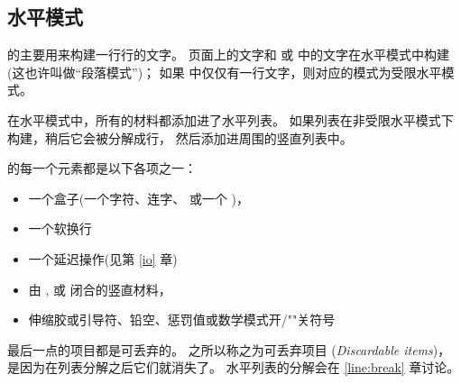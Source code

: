 \documentclass{book}
\begin{document}
\subsection{水平模式}

的主要用来构建一行行的文字。
页面上的文字和  或  中的文字在水平模式中构建
(这也许叫做“段落模式”)；
如果  中仅仅有一行文字，则对应的模式为受限水平模式。

在水平模式中，所有的材料都添加进了水平列表。
如果列表在非受限水平模式下构建，稍后它会被分解成行，
然后添加进周围的竖直列表中。

的每一个元素都是以下各项之一：
\begin{itemize}
  \item 一个盒子(一个字符、连字、 或一个 )，
  \item 一个软换行
  \item 一个延迟操作(见第 \ref{io} 章)
  \item 由 ,  或  闭合的竖直材料，
  \item 
\mdqon
伸缩胶或引导符、铅空、惩罚值或数学模式开/""关符号
\mdqoff
\end{itemize}
最后一点的项目都是可丢弃的。
之所以称之为可丢弃项目
(\emph{Discardable items})，
是因为在列表分解之后它们就消失了。
水平列表的分解会在 \ref{line:break} 章讨论。
\end{document}
